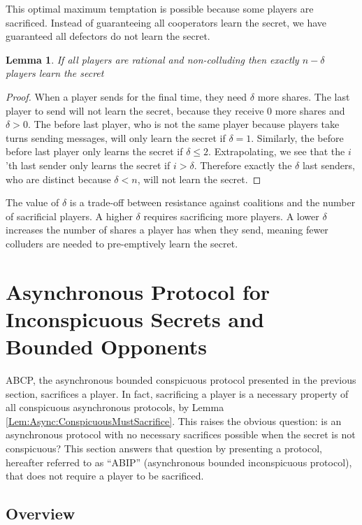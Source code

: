 \documentclass{dalcsthesis}
\newtheorem{lemma}{Lemma}
\begin{document}
This optimal maximum temptation is possible because some players are sacrificed. Instead of guaranteeing all cooperators learn the secret, we have guaranteed all defectors do not learn the secret.

\begin{lemma} If all players are rational and non-colluding then exactly $n - \delta$ players learn the secret \end{lemma}
\begin{proof}
When a player sends for the final time, they need $\delta$ more shares. The last player to send will not learn the secret, because they receive 0 more shares and $\delta > 0$. The before last player, who is not the same player because players take turns sending messages, will only learn the secret if $\delta = 1$. Similarly, the before before last player only learns the secret if $\delta \leq 2$. Extrapolating, we see that the $i$'th last sender only learns the secret if $i > \delta$. Therefore exactly the $\delta$ last senders, who are distinct because $\delta < n$, will not learn the secret.
\end{proof}

The value of $\delta$ is a trade-off between resistance against coalitions and the number of sacrificial players. A higher $\delta$ requires sacrificing more players. A lower $\delta$ increases the number of shares a player has when they send, meaning fewer colluders are needed to pre-emptively learn the secret.



\section{Asynchronous Protocol for Inconspicuous Secrets and Bounded Opponents}

ABCP, the asynchronous bounded conspicuous protocol presented in the previous section, sacrifices a player. In fact, sacrificing a player is a necessary property of all conspicuous asynchronous protocols, by Lemma \ref{Lem:Async:ConspicuousMustSacrifice}. This raises the obvious question: is an asynchronous protocol with no necessary sacrifices possible when the secret is not conspicuous? This section answers that question by presenting a protocol, hereafter referred to as ``ABIP'' (asynchronous bounded inconspicuous protocol), that does not require a player to be sacrificed.


\subsection{Overview}
\end{document}
